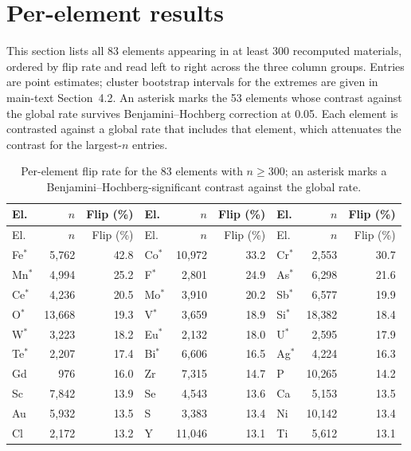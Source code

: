 \documentclass[11pt]{article}
\begin{document}
\section{Per-element results}\label{app:element}

This section lists all 83 elements appearing in at least 300 recomputed materials,
ordered by flip rate and read left to right across the three column groups. Entries are point estimates; cluster bootstrap
intervals for the extremes are given in main-text Section~4.2. An asterisk marks the
53 elements whose contrast against the global rate survives Benjamini--Hochberg
correction at 0.05. Each element is contrasted against a global rate that includes that
element, which attenuates the contrast for the largest-$n$ entries.

\footnotesize
\begin{longtable}{lrr@{\hspace{1.6em}}lrr@{\hspace{1.6em}}lrr}
\caption{Per-element flip rate for the 83 elements with $n \ge 300$; an asterisk marks a Benjamini--Hochberg-significant contrast against the global rate.}\label{tab:appelement}\\
\toprule
El. & $n$ & Flip (\%) & El. & $n$ & Flip (\%) & El. & $n$ & Flip (\%) \\
\midrule
\endfirsthead
\toprule
El. & $n$ & Flip (\%) & El. & $n$ & Flip (\%) & El. & $n$ & Flip (\%) \\
\midrule
\endhead
Fe$^{*}$ & 5{,}762 & 42.8 & Co$^{*}$ & 10{,}972 & 33.2 & Cr$^{*}$ & 2{,}553 & 30.7 \\
Mn$^{*}$ & 4{,}994 & 25.2 & F$^{*}$ & 2{,}801 & 24.9 & As$^{*}$ & 6{,}298 & 21.6 \\
Ce$^{*}$ & 4{,}236 & 20.5 & Mo$^{*}$ & 3{,}910 & 20.2 & Sb$^{*}$ & 6{,}577 & 19.9 \\
O$^{*}$ & 13{,}668 & 19.3 & V$^{*}$ & 3{,}659 & 18.9 & Si$^{*}$ & 18{,}382 & 18.4 \\
W$^{*}$ & 3{,}223 & 18.2 & Eu$^{*}$ & 2{,}132 & 18.0 & U$^{*}$ & 2{,}595 & 17.9 \\
Te$^{*}$ & 2{,}207 & 17.4 & Bi$^{*}$ & 6{,}606 & 16.5 & Ag$^{*}$ & 4{,}224 & 16.3 \\
Gd & 976 & 16.0 & Zr & 7{,}315 & 14.7 & P & 10{,}265 & 14.2 \\
Sc & 7{,}842 & 13.9 & Se & 4{,}543 & 13.6 & Ca & 5{,}153 & 13.5 \\
Au & 5{,}932 & 13.5 & S & 3{,}383 & 13.4 & Ni & 10{,}142 & 13.4 \\
Cl & 2{,}172 & 13.2 & Y & 11{,}046 & 13.1 & Ti & 5{,}612 & 13.1 \\

\end{longtable}
\end{document}
